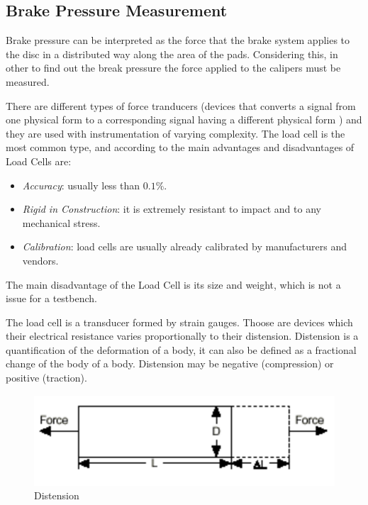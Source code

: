 \subsection{Brake Pressure Measurement}\label{ssec:load-cell}

	Brake pressure can be interpreted as the force that the brake system applies to the disc in a distributed way along the area of the pads. Considering this, in other to find out the break pressure the force applied to the calipers must be measured.
	\par
	There are different types of force tranducers (devices that converts a signal from one physical form to a corresponding signal having a different physical form \cite{palla2012sensors}) and they are used with instrumentation of varying complexity. The load cell is the most common type, and according to \cite{dillon1989load} the main advantages and disadvantages of Load Cells are: 

	\begin{itemize}
		\item \textit{Accuracy}: usually less than $0.1\%$.\label{itm:accuracy-load-cell}
		\item \textit{Rigid in Construction}: it is extremely resistant to impact and to any mechanical stress.\label{itm:rigid-load-cell}
		\item \textit{Calibration}: load cells are usually already calibrated by manufacturers and vendors.\label{itm:calibration-load-cell}
	\end{itemize}

	The main disadvantage of the Load Cell is its size and weight, which is not a issue for a testbench.
	\par
	The load cell is a transducer formed by strain gauges. Thoose are devices which their electrical resistance varies proportionally to their distension. Distension is a quantification of the deformation of a body, it can also be defined as a fractional change of the body of a body. Distension may be negative (compression) or positive (traction).

	\begin{figure}[htbp]
		\centering
			\includegraphics[scale=0.6]{figuras/fig-distension.png}
		\caption{Distension \cite{strain-def}}
		\label{fig:distension}
	\end{figure}

